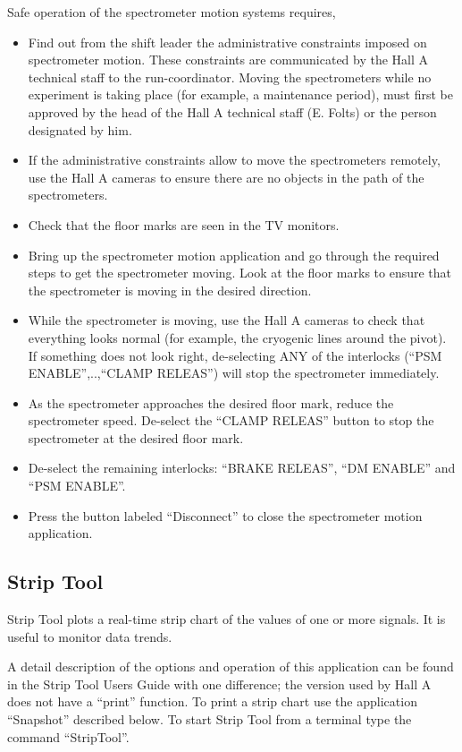 {\begin{safetyen}{30}{10}
Safe operation of the spectrometer motion systems requires,
\begin{itemize}
\item Find out from the shift leader the administrative constraints imposed on
spectrometer motion.
These constraints are communicated by the Hall A technical staff to the run-coordinator.
Moving the spectrometers while no experiment is taking place (for example,
a maintenance period), must first be approved by the head of the Hall A technical
staff (E. Folts) or the person designated by him.
\item If the administrative constraints allow to move the spectrometers remotely,
use the Hall A cameras
to ensure there are no objects in the path of the spectrometers.
\item Check that the floor marks are seen in the TV monitors.
\item Bring up the spectrometer motion application and go through the required steps
to get the spectrometer moving. Look at the floor marks
to ensure that the spectrometer is moving in the desired direction.
\item While the spectrometer is moving, use
the Hall A cameras to check that everything looks normal (for example, the cryogenic lines
around the pivot). If something does not look right, de-selecting ANY of the
interlocks (``PSM ENABLE'',..,``CLAMP RELEAS'') will stop the spectrometer immediately.
\item As the spectrometer approaches the desired floor mark, reduce the spectrometer
speed. De-select the ``CLAMP RELEAS'' button to stop the spectrometer at the desired floor mark.
\item De-select the remaining interlocks: ``BRAKE RELEAS'', ``DM ENABLE'' and ``PSM ENABLE''.
\item Press the button labeled ``Disconnect'' to close the spectrometer motion
application.
\end{itemize}
\end{safetyen}

\subsection{Strip Tool}
Strip Tool plots a real-time strip chart of the values of one or more signals.
It is useful to monitor data trends.

A detail description of the options and operation
of this application can be found in the Strip Tool Users
Guide
with one difference; the version used by Hall A does not have a ``print'' function.
To print a strip chart use the application ``Snapshot'' described below.
To start Strip Tool from a terminal type the command ``StripTool''.

}
